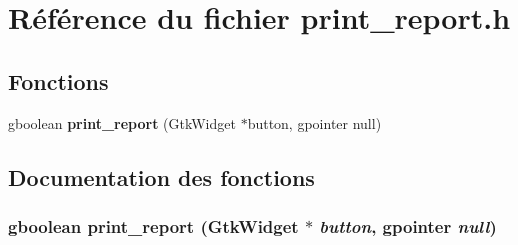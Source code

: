 \section{Référence du fichier print\_\-report.h}
\label{print__report_8h}
\subsection*{Fonctions}
\begin{DoxyCompactItemize}
\item 
gboolean {\bf print\_\-report} (GtkWidget $\ast$button, gpointer null)
\end{DoxyCompactItemize}


\subsection{Documentation des fonctions}
\subsubsection[{print\_\-report}]{\setlength{\rightskip}{0pt plus 5cm}gboolean print\_\-report (GtkWidget $\ast$ {\em button}, \/  gpointer {\em null})}\label{print__report_8h_a2a3450abdd3448d5b2a22d54784d4ad8}
